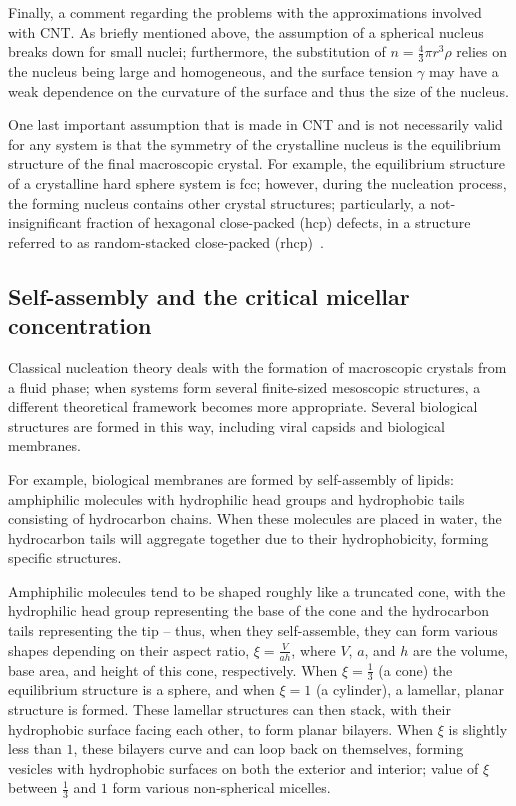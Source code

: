 Finally, a comment regarding the problems with the approximations involved with CNT.
As briefly mentioned above, the assumption of a spherical nucleus breaks down for small nuclei; furthermore, the substitution of $n = \frac{4}{3} \pi r^3 \rho$ relies on the nucleus being large and homogeneous, and the surface tension $\gamma$ may have a weak dependence on the curvature of the surface and thus the size of the nucleus.

One last important assumption that is made in CNT and is not necessarily valid for any system is that the symmetry of the crystalline nucleus is the equilibrium structure of the final macroscopic crystal.
For example, the equilibrium structure of a crystalline hard sphere system is fcc; however, during the nucleation process, the forming nucleus contains other crystal structures; particularly, a not-insignificant fraction of hexagonal close-packed (hcp) defects, in a structure referred to as random-stacked close-packed (rhcp)~\cite{auerthesis}.

\subsection{Self-assembly and the critical micellar concentration}\label{sec:cmc}
Classical nucleation theory deals with the formation of macroscopic crystals from a fluid phase; when systems form several finite-sized mesoscopic structures, a different theoretical framework becomes more appropriate.
Several biological structures are formed in this way, including viral capsids and biological membranes.

For example, biological membranes are formed by self-assembly of lipids: amphiphilic molecules with hydrophilic head groups and hydrophobic tails consisting of hydrocarbon chains.
When these molecules are placed in water, the hydrocarbon tails will aggregate together due to their hydrophobicity, forming specific structures.

Amphiphilic molecules tend to be shaped roughly like a truncated cone, with the hydrophilic head group representing the base of the cone and the hydrocarbon tails representing the tip -- thus, when they self-assemble, they can form various shapes depending on their aspect ratio, $\xi = \frac{V}{ah}$, where $V$, $a$, and $h$ are the volume, base area, and height of this cone, respectively.
When $\xi = \frac{1}{3}$ (a cone) the equilibrium structure is a sphere, and when $\xi =1$ (a cylinder), a lamellar, planar structure is formed.  These lamellar structures can then stack, with their hydrophobic surface facing each other, to form planar bilayers.
When $\xi$ is slightly less than $1$, these bilayers curve and can loop back on themselves, forming vesicles with hydrophobic surfaces on both the exterior and interior; value of $\xi$ between $\frac{1}{3}$ and $1$ form various non-spherical micelles.

